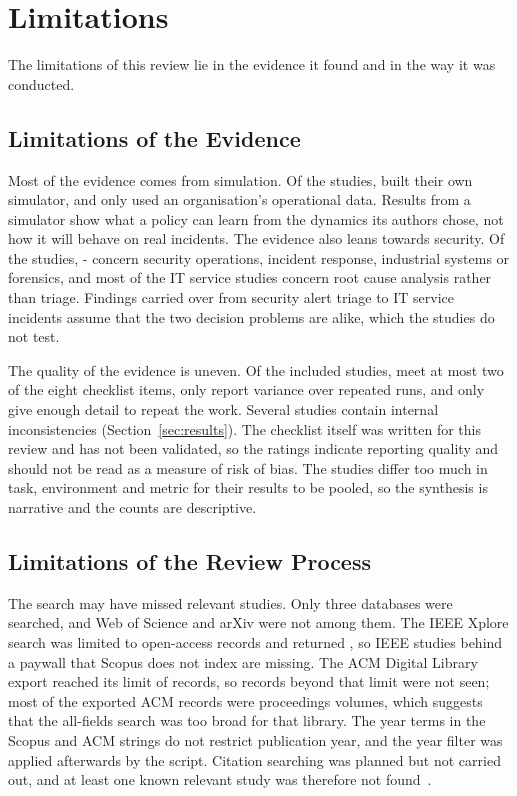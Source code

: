 \section{Limitations}
\label{sec:limitations}

The limitations of this review lie in the evidence it found and in the way it was conducted.

\subsection{Limitations of the Evidence}

Most of the evidence comes from simulation. Of the \NIncluded{} studies, \NEnvSim{} built their own simulator, and only \NEnvOps{} used an organisation's operational data. Results from a simulator show what a policy can learn from the dynamics its authors chose, not how it will behave on real incidents. The evidence also leans towards security. Of the \NIncluded{} studies, \the\numexpr\NIncluded-\NSetITOPS\relax{} concern security operations, incident response, industrial systems or forensics, and most of the \NSetITOPS{} IT service studies concern root cause analysis rather than triage. Findings carried over from security alert triage to IT service incidents assume that the two decision problems are alike, which the studies do not test.

The quality of the evidence is uneven. Of the included studies, \NQLow{} meet at most two of the eight checklist items, only \NQFive{} report variance over repeated runs, and only \NQEight{} give enough detail to repeat the work. Several studies contain internal inconsistencies (Section~\ref{sec:results}). The checklist itself was written for this review and has not been validated, so the ratings indicate reporting quality and should not be read as a measure of risk of bias. The studies differ too much in task, environment and metric for their results to be pooled, so the synthesis is narrative and the counts are descriptive.

\subsection{Limitations of the Review Process}

The search may have missed relevant studies. Only three databases were searched, and Web of Science and arXiv were not among them. The IEEE Xplore search was limited to open-access records and returned \NIEEE, so IEEE studies behind a paywall that Scopus does not index are missing. The ACM Digital Library export reached its limit of \NACM{} records, so records beyond that limit were not seen; most of the exported ACM records were proceedings volumes, which suggests that the all-fields search was too broad for that library. The year terms in the Scopus and ACM strings do not restrict publication year, and the year filter was applied afterwards by the script. Citation searching was planned but not carried out, and at least one known relevant study was therefore not found~\cite{ren2025}.

